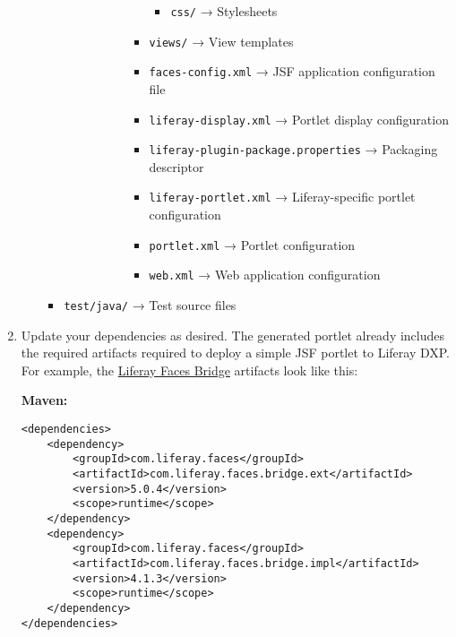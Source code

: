 \begin{enumerate}
\begin{itemize}
\begin{itemize}
\begin{itemize}
\begin{itemize}
\begin{itemize}
\begin{itemize}
              \begin{itemize}
              \tightlist
              \item
                \texttt{css/} → Stylesheets
              \end{itemize}
            \item
              \texttt{views/} → View templates
            \item
              \texttt{faces-config.xml} → JSF application configuration
              file
            \item
              \texttt{liferay-display.xml} → Portlet display
              configuration
            \item
              \texttt{liferay-plugin-package.properties} → Packaging
              descriptor
            \item
              \texttt{liferay-portlet.xml} → Liferay-specific portlet
              configuration
            \item
              \texttt{portlet.xml} → Portlet configuration
            \item
              \texttt{web.xml} → Web application configuration
            \end{itemize}
          \end{itemize}
        \end{itemize}
      \end{itemize}
    \item
      \texttt{test/java/} → Test source files
    \end{itemize}
  \end{itemize}
\item
  Update your dependencies as desired. The generated portlet already
  includes the required artifacts required to deploy a simple JSF
  portlet to Liferay DXP. For example, the
  \href{/docs/7-2/reference/-/knowledge_base/r/understanding-liferay-faces-bridge}{Liferay
  Faces Bridge} artifacts look like this:

  \textbf{Maven:}

\begin{verbatim}
<dependencies>
    <dependency>
        <groupId>com.liferay.faces</groupId>
        <artifactId>com.liferay.faces.bridge.ext</artifactId>
        <version>5.0.4</version>
        <scope>runtime</scope>
    </dependency>
    <dependency>
        <groupId>com.liferay.faces</groupId>
        <artifactId>com.liferay.faces.bridge.impl</artifactId>
        <version>4.1.3</version>
        <scope>runtime</scope>
    </dependency>
</dependencies>
\end{verbatim}


\end{enumerate}
